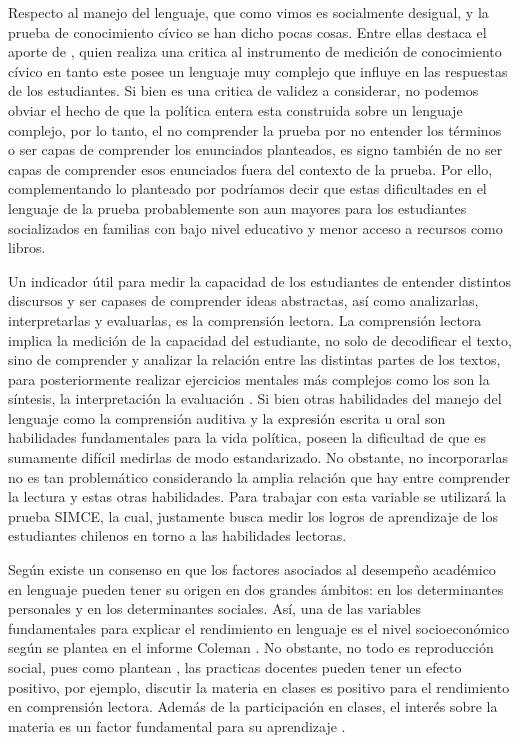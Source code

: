\documentclass[12pt,twoside]{templates/facsothesis}
\begin{document}
Respecto al manejo del lenguaje, que como vimos es socialmente desigual, y la prueba de conocimiento cívico se han dicho pocas cosas. Entre ellas destaca el aporte de \citet{ZhangUnderstandingciviccognitive2015}, quien realiza una critica al instrumento de medición de conocimiento cívico en tanto este posee un lenguaje muy complejo que influye en las respuestas de los estudiantes. Si bien es una critica de validez a considerar, no podemos obviar el hecho de que la política entera esta construida sobre un lenguaje complejo, por lo tanto, el no comprender la prueba por no entender los términos o ser capas de comprender los enunciados planteados, es signo también de no ser capas de comprender esos enunciados fuera del contexto de la prueba. Por ello, complementando lo planteado por \citet{ZhangUnderstandingciviccognitive2015} podríamos decir que estas dificultades en el lenguaje de la prueba probablemente son aun mayores para los estudiantes socializados en familias con bajo nivel educativo y menor acceso a recursos como libros.

Un indicador útil para medir la capacidad de los estudiantes de entender distintos discursos y ser capases de comprender ideas abstractas, así como analizarlas, interpretarlas y evaluarlas, es la comprensión lectora. La comprensión lectora implica la medición de la capacidad del estudiante, no solo de decodificar el texto, sino de comprender y analizar la relación entre las distintas partes de los textos, para posteriormente realizar ejercicios mentales más complejos como los son la síntesis, la interpretación la evaluación \citep{aceInformeTecnicoSimce2018}. Si bien otras habilidades del manejo del lenguaje como la comprensión auditiva y la expresión escrita u oral son habilidades fundamentales para la vida política, poseen la dificultad de que es sumamente difícil medirlas de modo estandarizado. No obstante, no incorporarlas no es tan problemático considerando la amplia relación que hay entre comprender la lectura y estas otras habilidades. Para trabajar con esta variable se utilizará la prueba SIMCE, la cual, justamente busca medir los logros de aprendizaje de los estudiantes chilenos en torno a las habilidades lectoras.

Según \citet{barahonauFactoresDeterminantesRendimiento2014} existe un consenso en que los factores asociados al desempeño académico en lenguaje pueden tener su origen en dos grandes ámbitos: en los determinantes personales y en los determinantes sociales. Así, una de las variables fundamentales para explicar el rendimiento en lenguaje es el nivel socioeconómico según se plantea en el informe Coleman \citep{marquesApuntesSobreInforme2016}. No obstante, no todo es reproducción social, pues como plantean \citet{laraMiradaEfectividadProfesores2010}, las practicas docentes pueden tener un efecto positivo, por ejemplo, discutir la materia en clases es positivo para el rendimiento en comprensión lectora. Además de la participación en clases, el interés sobre la materia es un factor fundamental para su aprendizaje \citep{lozanoRelacionEntreMotivacion2000}.
\end{document}
